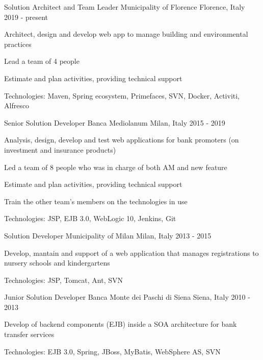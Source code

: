 

\begin{cventries}

\cventry
  {Solution Architect and Team Leader}
  {Municipality of Florence}
  {Florence, Italy}
  {2019 - present}
  {
    \begin{cvitems}
      \item {Architect, design and develop web app to manage building and environmental practices}
      \item {Lead a team of 4 people}
      \item {Estimate and plan activities, providing technical support}
      \item {Technologies: Maven, Spring ecosystem, Primefaces, SVN, Docker, Activiti, Alfresco}
    \end{cvitems}
  }

\cventry
  {Senior Solution Developer}
  {Banca Mediolanum}
  {Milan, Italy}
  {2015 - 2019}
  {
    \begin{cvitems}
      \item {Analysis, design, develop and test web applications for bank promoters (on investment and insurance products) }
      \item {Led a team of 8 people who was in charge of both AM and new feature}
      \item {Estimate and plan activities, providing technical support}
      \item {Train the other team's members on the technologies in use}
      \item {Technologies: JSP, EJB 3.0, WebLogic 10, Jenkins, Git}
    \end{cvitems}
  }

\cventry
  {Solution Developer}
  {Municipality of Milan}
  {Milan, Italy}
  {2013 - 2015}
  {
    \begin{cvitems}
      \item {Develop, mantain and support of a web application that manages registrations to nursery schools and kindergartens}
      \item {Technologies: JSP, Tomcat, Ant, SVN}
    \end{cvitems}
  }

\cventry
  {Junior Solution Developer}
  {Banca Monte dei Paschi di Siena}
  {Siena, Italy}
  {2010 - 2013}
  {
    \begin{cvitems}
      \item {Develop of backend components (EJB) inside a SOA architecture for bank transfer services}
      \item {Technologies: EJB 3.0, Spring, JBoss, MyBatis, WebSphere AS, SVN}
    \end{cvitems} 
  }
\end{cventries}
